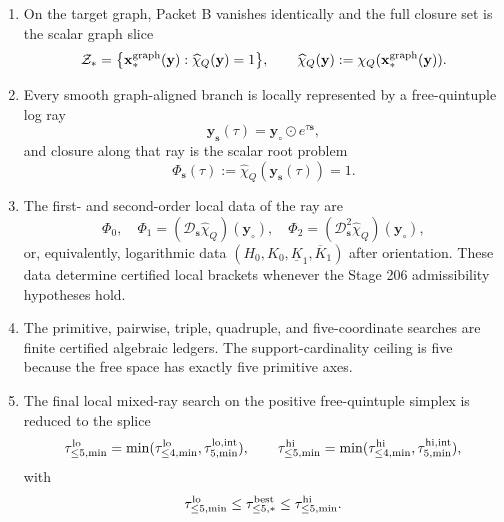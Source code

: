 \begin{theorem}
\begin{enumerate}[leftmargin=2.2em]
\begin{equation}
  \end{equation}
  \item On the target graph, Packet B vanishes identically and the full closure set is the scalar graph slice
  \begin{equation}
  \label{eq:app-part06-main-graph-slice}
  \mathcal Z_*
  =
  \bigl\{\mathbf x_*^{\rm graph}(\mathbf y):\widehat\chi_Q(\mathbf y)=1\bigr\},
  \qquad
  \widehat\chi_Q(\mathbf y):=\chi_Q(\mathbf x_*^{\rm graph}(\mathbf y)).
  \end{equation}
  \item Every smooth graph-aligned branch is locally represented by a free-quintuple log ray
  \begin{equation}
  \label{eq:app-part06-main-logray}
  \mathbf y_{\mathbf s}(\tau)=\mathbf y_\circ\odot e^{\tau\mathbf s},
  \end{equation}
  and closure along that ray is the scalar root problem
  \begin{equation}
  \label{eq:app-part06-main-scalar-root}
  \Phi_{\mathbf s}(\tau):=\widehat\chi_Q(\mathbf y_{\mathbf s}(\tau))=1.
  \end{equation}
  \item The first- and second-order local data of the ray are
  \begin{equation}
  \label{eq:app-part06-main-hessian-data}
  \Phi_0,
  \quad
  \Phi_1=(\mathcal D_{\mathbf s}\widehat\chi_Q)(\mathbf y_\circ),
  \quad
  \Phi_2=(\mathcal D_{\mathbf s}^2\widehat\chi_Q)(\mathbf y_\circ),
  \end{equation}
  or, equivalently, logarithmic data \((H_0,K_0,\underline K_1,\overline K_1)\) after orientation.  These data determine certified local brackets whenever the Stage 206 admissibility hypotheses hold.
  \item The primitive, pairwise, triple, quadruple, and five-coordinate searches are finite certified algebraic ledgers.  The support-cardinality ceiling is five because the free space has exactly five primitive axes.
  \item The final local mixed-ray search on the positive free-quintuple simplex is reduced to the splice
  \begin{equation}
  \label{eq:app-part06-main-final-splice}
  \tau_{\le5,\min}^{\rm lo}
  =
  \min(\tau_{\le4,\min}^{\rm lo},\tau_{5,\min}^{\rm lo,int}),
  \qquad
  \tau_{\le5,\min}^{\rm hi}
  =
  \min(\tau_{\le4,\min}^{\rm hi},\tau_{5,\min}^{\rm hi,int}),
  \end{equation}
  with
  \begin{equation}
  \label{eq:app-part06-main-final-bound}
  \tau_{\le5,\min}^{\rm lo}
  \le
  \tau_{\le5,*}^{\rm best}
  \le
  \tau_{\le5,\min}^{\rm hi}.
  \end{equation}
\end{enumerate}
\end{theorem}

